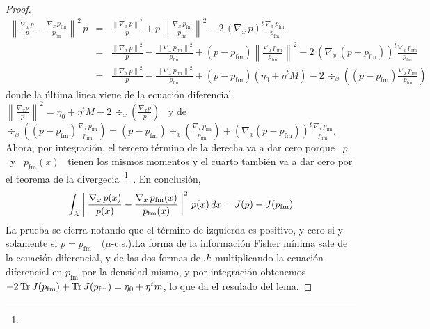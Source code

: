 \begin{proof}
  \begin{eqnarray*}
  \left\| \frac{\nabla_x \, p}{p} - \frac{\nabla_x
  \, p_{\mathrm{fm}}}{p_{\mathrm{fm}}} \right\|^2 \, p
  & = & \frac{\left\| \nabla_x \, p \right\|^2}{p} +
  p \, \left\| \frac{\nabla_x \, p_{\mathrm{fm}}}{p_{\mathrm{fm}}} \right\|^2 -
  2 \, \left( \nabla_x \, p \right)^t \frac{\nabla_x \,
  p_{\mathrm{fm}}}{p_{\mathrm{fm}}} \\[2.5mm]
  & = & \frac{\left\| \nabla_x \, p \right\|^2}{p} - \frac{\left\| \nabla_x \,
  p_{\mathrm{fm}} \right\|^2}{p_{\mathrm{fm}}} + \left( p -
  p_{\mathrm{fm}} \right) \left\| \frac{\nabla_x \,
  p_{\mathrm{fm}}}{p_{\mathrm{fm}}}  \right\|^2 - 2 \, \left( \nabla_x \, \left( p -
  p_{\mathrm{fm}} \right) \right)^t \frac{\nabla_x \, p_{\mathrm{fm}}}{p_{\mathrm{fm}}}\\[2.5mm]
  & = & \frac{\left\| \nabla_x \, p \right\|^2}{p} - \frac{\left\| \nabla_x \,
  p_{\mathrm{fm}} \right\|^2}{p_{\mathrm{fm}}} + \left( p -
  p_{\mathrm{fm}} \right) \left( \eta_0 + \eta^t M \right) - 2 \, \div_x\left( \left(
  p        -       p_{\mathrm{fm}}        \right)       \frac{\nabla_x        \,
  p_{\mathrm{fm}}}{p_{\mathrm{fm}}}      \right)
  \end{eqnarray*}
  donde   la   \'ultima   linea   viene   de   la   ecuaci\'on   diferencial   \
  $\left\|   \frac{\nabla_x   p}{p}  \right\|^2   =   \eta_0   +  \eta^t   M   -
  2 \, \div_x \left( \frac{\nabla_x p}{p} \right)$ \ y de \ $\div_x\left( \left(
  p        -       p_{\mathrm{fm}}        \right)       \frac{\nabla_x        \,
  p_{\mathrm{fm}}}{p_{\mathrm{fm}}}      \right)      =     \left(      p      -
  p_{\mathrm{fm}}       \right)       \div_x\left(       \frac{\nabla_x       \,
  p_{\mathrm{fm}}}{p_{\mathrm{fm}}}  \right)  +  \left(   \nabla_x  \left(  p  -
  p_{\mathrm{fm}}        \right)     \right)^t            \frac{\nabla_x             \,
  p_{\mathrm{fm}}}{p_{\mathrm{fm}}}$.
  Ahora, por  integraci\'on, el tercero  t\'ermino de la  derecha va a  dar cero
  porque \  $p$ \  y \ $p_{\mathrm{fm}}(x)$  \ tienen los  mismos momentos  y el
  cuarto tambi\'en va a dar cero por el teorema de la divergecia~\footnote{\SZ{A
  dar}}~\cite{toto}. En conclusi\'on,
  \[
  \int_{\mathcal{X}} \left\| \frac{\nabla_x \, p(x)}{p(x)} - \frac{\nabla_x
  \, p_{\mathrm{fm}}(x)}{p_{\mathrm{fm}}(x)} \right\|^2 \, p(x) \, dx = J(p) - J(p_{\mathrm{fm}})
  \]
  La  prueba se cierra notando que
  el  t\'ermino de  izquierda es  positivo,  y cero  si  y solamente  si $p  =
  p_{\mathrm{fm}} \quad (\mu$-c.s.).\newline La forma de la informaci\'on Fisher
  m\'inima  sale de  la ecuaci\'on  diferencial,  y de  las dos  formas de  $J$:
  multiplicando la  ecuaci\'on diferencial en $p_{\mathrm{fm}}$  por la densidad
  mismo,  y  por integraci\'on  obtenemos  $-  2  \operatorname{Tr} J(p_{\mathrm{fm}})  +  \operatorname{Tr}
  J(p_{\mathrm{fm}}) = \eta_0 + \eta^t m$, lo que da el resulado del lema.
\end{proof}
